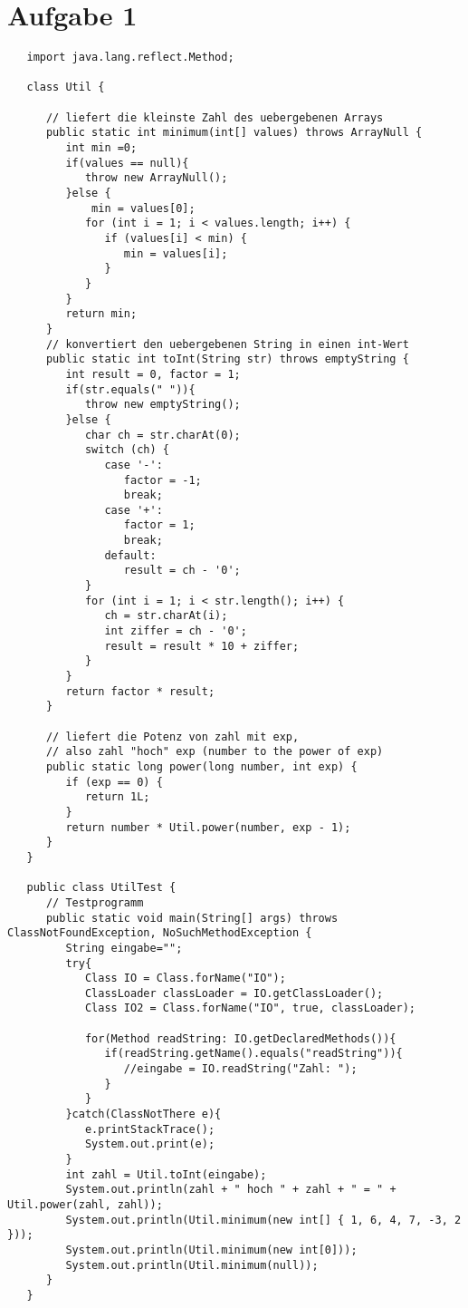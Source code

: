 \documentclass[12pt,a4paper,oneside,ngerman]{article}
\begin{document}

\section*{Aufgabe 1}
\begin{lstlisting}
   import java.lang.reflect.Method;

   class Util {
   
      // liefert die kleinste Zahl des uebergebenen Arrays
      public static int minimum(int[] values) throws ArrayNull {
         int min =0;
         if(values == null){
            throw new ArrayNull();
         }else {
             min = values[0];
            for (int i = 1; i < values.length; i++) {
               if (values[i] < min) {
                  min = values[i];
               }
            }
         }
         return min;
      }
      // konvertiert den uebergebenen String in einen int-Wert
      public static int toInt(String str) throws emptyString {
         int result = 0, factor = 1;
         if(str.equals(" ")){
            throw new emptyString();
         }else {
            char ch = str.charAt(0);
            switch (ch) {
               case '-':
                  factor = -1;
                  break;
               case '+':
                  factor = 1;
                  break;
               default:
                  result = ch - '0';
            }
            for (int i = 1; i < str.length(); i++) {
               ch = str.charAt(i);
               int ziffer = ch - '0';
               result = result * 10 + ziffer;
            }
         }
         return factor * result;
      }
   
      // liefert die Potenz von zahl mit exp,
      // also zahl "hoch" exp (number to the power of exp)
      public static long power(long number, int exp) {
         if (exp == 0) {
            return 1L;
         }
         return number * Util.power(number, exp - 1);
      }
   }
   
   public class UtilTest {
      // Testprogramm
      public static void main(String[] args) throws ClassNotFoundException, NoSuchMethodException {
         String eingabe="";
         try{
            Class IO = Class.forName("IO");
            ClassLoader classLoader = IO.getClassLoader();
            Class IO2 = Class.forName("IO", true, classLoader);
   
            for(Method readString: IO.getDeclaredMethods()){
               if(readString.getName().equals("readString")){
                  //eingabe = IO.readString("Zahl: ");
               }
            }
         }catch(ClassNotThere e){
            e.printStackTrace();
            System.out.print(e);
         }
         int zahl = Util.toInt(eingabe);
         System.out.println(zahl + " hoch " + zahl + " = " + Util.power(zahl, zahl));
         System.out.println(Util.minimum(new int[] { 1, 6, 4, 7, -3, 2 }));
         System.out.println(Util.minimum(new int[0]));
         System.out.println(Util.minimum(null));
      }
   }
   

\end{lstlisting}
\end{document}
